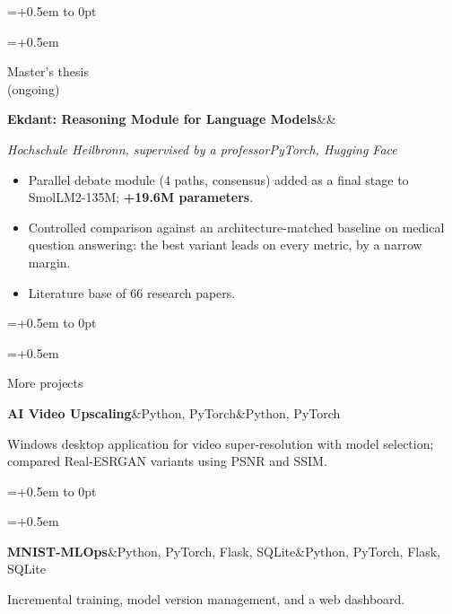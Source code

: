 \documentclass[10pt,a4paper]{article}
\newlength{\leftcol}\setlength{\leftcol}{2.45cm}
\newcommand{\gap}{0.5em}
\newcommand{\sep}{\hspace{0.45em}\textbar\hspace{0.45em}}
\newcommand{\entry}[3]{%
  \begingroup\raggedright\leftskip=\dimexpr\leftcol+\gap\relax\noindent
  \hspace*{-\dimexpr\leftcol+\gap\relax}%
  \vtop to 0pt{\hsize=\dimexpr\leftcol+\gap\relax\raggedright\small\color{mid}\noindent #1\par\vss}%
  #2\par #3\par\endgroup\vspace{5pt}}
\newcommand{\etitle}[2]{\textbf{#1}\ifx&#2&\else\textcolor{mid}{\sep}#2\fi}
\newcommand{\stack}[1]{{\small\itshape\color{mid}#1}\par\vspace{5pt}}
\begin{document}
\newpage
\entry{Master's thesis\\(ongoing)}
  {\etitle{Ekdant: Reasoning Module for Language Models}{}}
  {\stack{Hochschule Heilbronn, supervised by a professor\sep PyTorch, Hugging Face}
  \begin{itemize}
    \item Parallel debate module (4 paths, consensus) added as a final stage to SmolLM2-135M; \textbf{+19.6M parameters}.
    \item Controlled comparison against an architecture-matched baseline on medical question answering: the best variant leads on every metric, by a narrow margin.
    \item Literature base of 66 research papers.
  \end{itemize}}
\entry{More projects}
  {\etitle{AI Video Upscaling}{Python, PyTorch}}
  {\small Windows desktop application for video super-resolution with model selection; compared Real-ESRGAN variants using PSNR and SSIM.}
\entry{\strut}
  {\etitle{MNIST-MLOps}{Python, PyTorch, Flask, SQLite}}
  {\small Incremental training, model version management, and a web dashboard.}
\end{document}
